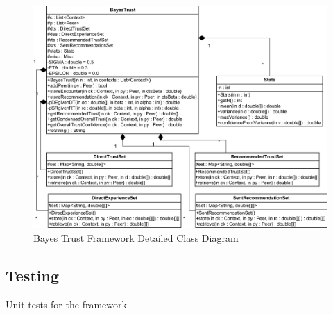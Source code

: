 \begin{figure}[h!]
  \centering  
  \includegraphics[width=1\textwidth]{images/bayestrustdetail}
  \caption{Bayes Trust Framework Detailed Class Diagram}
  \label{fig:xml2dttest}
\end{figure}


\subsection{Testing}
Unit tests for the framework